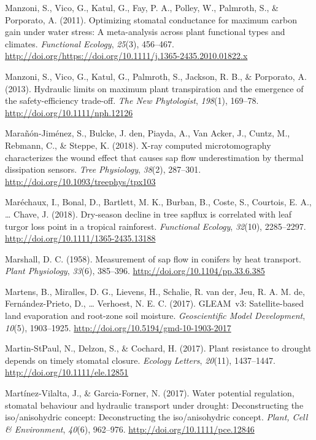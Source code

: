 \documentclass[11pt,twoside]{reedthesis}
\begin{document}
\hypertarget{ref-Manzoni2011}{}
Manzoni, S., Vico, G., Katul, G., Fay, P. A., Polley, W., Palmroth, S.,
\& Porporato, A. (2011). Optimizing stomatal conductance for maximum
carbon gain under water stress: A meta-analysis across plant functional
types and climates. \emph{Functional Ecology}, \emph{25}(3), 456--467.
\url{http://doi.org/https://doi.org/10.1111/j.1365-2435.2010.01822.x}

\hypertarget{ref-Manzoni2013}{}
Manzoni, S., Vico, G., Katul, G., Palmroth, S., Jackson, R. B., \&
Porporato, A. (2013). Hydraulic limits on maximum plant transpiration
and the emergence of the safety-efficiency trade-off. \emph{The New
Phytologist}, \emph{198}(1), 169--78.
\url{http://doi.org/10.1111/nph.12126}

\hypertarget{ref-Maranon-jimenez2018}{}
Marañón-Jiménez, S., Bulcke, J. den, Piayda, A., Van Acker, J., Cuntz,
M., Rebmann, C., \& Steppe, K. (2018). X-ray computed microtomography
characterizes the wound effect that causes sap flow underestimation by
thermal dissipation sensors. \emph{Tree Physiology}, \emph{38}(2),
287--301. \url{http://doi.org/10.1093/treephys/tpx103}

\hypertarget{ref-marechaux_dryseason_2018}{}
Maréchaux, I., Bonal, D., Bartlett, M. K., Burban, B., Coste, S.,
Courtois, E. A., \ldots{} Chave, J. (2018). Dry‐season decline in tree
sapflux is correlated with leaf turgor loss point in a tropical
rainforest. \emph{Functional Ecology}, \emph{32}(10), 2285--2297.
\url{http://doi.org/10.1111/1365-2435.13188}

\hypertarget{ref-Marshall1958}{}
Marshall, D. C. (1958). Measurement of sap flow in conifers by heat
transport. \emph{Plant Physiology}, \emph{33}(6), 385--396.
\url{http://doi.org/10.1104/pp.33.6.385}

\hypertarget{ref-Martens2017}{}
Martens, B., Miralles, D. G., Lievens, H., Schalie, R. van der, Jeu, R.
A. M. de, Fernández-Prieto, D., \ldots{} Verhoest, N. E. C. (2017).
GLEAM~v3: Satellite-based land evaporation and root-zone soil moisture.
\emph{Geoscientific Model Development}, \emph{10}(5), 1903--1925.
\url{http://doi.org/10.5194/gmd-10-1903-2017}

\hypertarget{ref-martin-stpaul2017}{}
Martin-StPaul, N., Delzon, S., \& Cochard, H. (2017). Plant resistance
to drought depends on timely stomatal closure. \emph{Ecology Letters},
\emph{20}(11), 1437--1447. \url{http://doi.org/10.1111/ele.12851}

\hypertarget{ref-martinez-vilalta_water_2017}{}
Martínez-Vilalta, J., \& Garcia-Forner, N. (2017). Water potential
regulation, stomatal behaviour and hydraulic transport under drought:
Deconstructing the iso/anisohydric concept: Deconstructing the
iso/anisohydric concept. \emph{Plant, Cell \& Environment},
\emph{40}(6), 962--976. \url{http://doi.org/10.1111/pce.12846}
\end{document}
